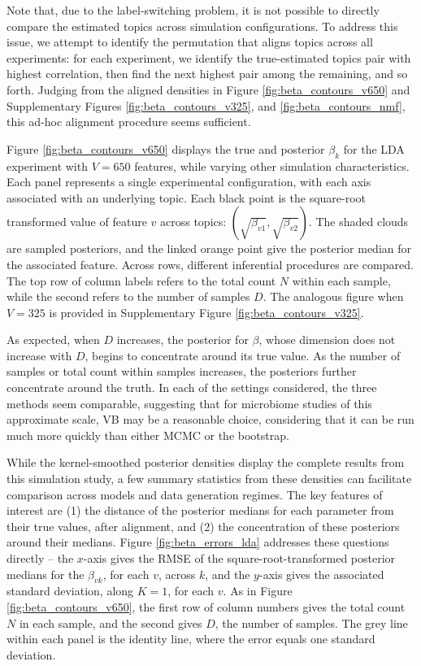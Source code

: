 \documentclass[oupdraft]{bio}
\begin{document}
Note that, due to the label-switching problem, it is not possible to directly
compare the estimated topics across simulation configurations. To address this
issue, we attempt to identify the permutation that aligns topics across all
experiments: for each experiment, we identify the true-estimated topics pair
with highest correlation, then find the next highest pair among the remaining,
and so forth. Judging from the aligned densities in Figure
\ref{fig:beta_contours_v650} and Supplementary Figures
\ref{fig:beta_contours_v325}, and \ref{fig:beta_contours_nmf}, this ad-hoc
alignment procedure seems sufficient.

Figure \ref{fig:beta_contours_v650} displays the true and posterior $\beta_{k}$
for the LDA experiment with $V = 650$ features, while varying other simulation
characteristics. Each panel represents a single experimental configuration, with
each axis associated with an underlying topic. Each black point is the
square-root transformed value of feature $v$ across topics:
$\left(\sqrt{\beta_{v1}}, \sqrt{\beta_{v2}}\right)$. The shaded clouds are
sampled posteriors, and the linked orange point give the posterior median for the
associated feature. Across rows, different inferential procedures are compared.
The top row of column labels refers to the total count $N$ within each sample,
while the second refers to the number of samples $D$. The analogous figure when
$V = 325$ is provided in Supplementary Figure \ref{fig:beta_contours_v325}.

As expected, when $D$ increases, the posterior for $\beta$, whose dimension does
not increase with $D$, begins to concentrate around its true value. As the
number of samples or total count within samples increases, the posteriors
further concentrate around the truth. In each of the settings considered, the
three methods seem comparable, suggesting that for microbiome studies of this
approximate scale, VB may be a reasonable choice, considering that it can be run
much more quickly than either MCMC or the bootstrap.

While the kernel-smoothed posterior densities display the complete results from
this simulation study, a few summary statistics from these densities can
facilitate comparison across models and data generation regimes. The key
features of interest are (1) the distance of the posterior medians for each
parameter from their true values, after alignment, and (2) the concentration of
these posteriors around their medians. Figure \ref{fig:beta_errors_lda}
addresses these questions directly -- the $x$-axis gives the RMSE of the
square-root-transformed posterior medians for the $\beta_{vk}$, for each $v$,
across $k$, and the $y$-axis gives the associated standard deviation, along $K =
1$, for each $v$. As in Figure \ref{fig:beta_contours_v650}, the first row of
column numbers gives the total count $N$ in each sample, and the second gives
$D$, the number of samples. The grey line within each panel is the identity
line, where the error equals one standard deviation.
\end{document}
